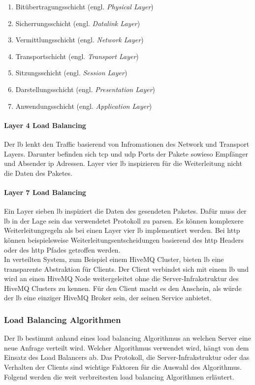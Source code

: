 \begin{enumerate}
    \item Bitübertragungsschicht (engl. \textit{Physical Layer})
    \item Sicherrungsschicht (engl. \textit{Datalink Layer})
    \item Vermittlungsschicht (engl. \textit{Network Layer})
    \item Transportschicht (engl. \textit{Transport Layer})
    \item Sitzungsschicht (engl. \textit{Session Layer})
    \item Darstellungsschicht (engl. \textit{Presentation Layer})
    \item Anwendungsschicht (engl. \textit{Application Layer})
\end{enumerate}
\cite{WhatOSIModel}
\paragraph{Layer 4 Load Balancing}
Der \ac{lb} lenkt den Traffic basierend von Infromationen des Network und Transport Layers. Darunter befinden sich \ac{tcp} und \ac{udp} Ports der Pakete sowieso Empfänger und Absender \ac{ip} Adressen. Layer vier \ac{lb} inspizieren für die Weiterleitung nicht die Daten des Paketes.
\cite{WhatLoadBalancer}

\paragraph{Layer 7 Load Balancing}
Ein Layer sieben \ac{lb} inspiziert die Daten des gesendeten Paketes. Dafür muss der \ac{lb} in der Lage sein das verwendetet Protokoll zu parsen. Es können komplexere Weiterleitungregeln als bei einen Layer vier \ac{lb} implementiert werden. Bei \ac{http} können beispielsweise Weiterleitungsentscheidungen basierend des \ac{http} Headers oder des \ac{http} Pfades getroffen werden.
\cite{WhatLoadBalancer}
\\
In verteilten System, zum Beispiel einem HiveMQ Cluster, bieten \acl{lb} eine transparente Abstraktion für Clients. Der Client verbindet sich mit einem \ac{lb} und wird an einen HiveMQ Node weitergeleitet ohne die Server-Infrakstruktur des HiveMQ Clusters zu kennen. Für den Client macht es den Anschein, als würde der \ac{lb} eine einziger HiveMQ Broker sein, der seinen Service anbietet.

\subsubsection{Load Balancing Algorithmen} \label{sb:lb-algo}
Der \acl{lb} bestimmt anhand eines load balancing Algorithmus an welchen Server eine neue Anfrage verteilt wird.
Welcher Algorithmus verwendet wird, hängt von dem Einsatz des Load Balancers ab.
Das Protokoll, die Server-Infrakstruktur oder das Verhalten der Clients sind wichtige Faktoren für die Auswahl des Algorithmus.
\\
Folgend werden die weit verbreitesten load balancing Algorithmen erläutert.

